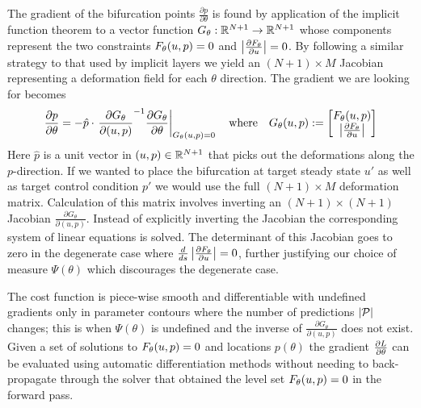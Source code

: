 \documentclass{article}
\begin{document}
The gradient of the bifurcation points $\frac{\partial p}{\partial\theta}$ is found by application of the implicit function theorem to a vector function $G_{\theta}:\mathbb{R}^{N+1}\rightarrow\mathbb{R}^{N+1}$ whose components represent the two constraints $F_{\theta}(u,p)=0$ and $\left| \frac{\partial F_{\theta}}{\partial u} \right|=0$. By following a similar strategy to that used by implicit layers \cite{Look2020DifferentiableLayers} we yield an $(N+1)\times M$ Jacobian representing a deformation field \cite{Jos2011OnSurface} for each $\theta$ direction. The gradient we are looking for becomes
\begin{align}
    \frac{\partial p}{\partial\theta} = -\hat{p}\cdot\left.\frac{\partial G_{\theta}}{\partial (u,p)}^{-1}
    \frac{\partial  G_{\theta}}{\partial\theta}\right|_{G_{\theta}(u,p)=0}
    \quad\mathrm{where}\quad
    G_{\theta}(u,p):=\begin{bmatrix}F_{\theta}(u,p)\\\left| \frac{\partial F_{\theta}}{\partial u} \right|\end{bmatrix}
    \label{eq:gradient-bifurcation}
\end{align}
Here $\hat{p}$ is a unit vector in $(u,p)\in\mathbb{R}^{N+1}$ that picks out the deformations along the $p$-direction. If we wanted to place the bifurcation at target steady state $u'$ as well as target control condition $p'$ we would use the full $(N+1)\times M$ deformation matrix. Calculation of this matrix involves inverting an $(N+1)\times(N+1)$ Jacobian $\frac{\partial G_{\theta}}{\partial(u,p)}$. Instead of explicitly inverting the Jacobian the corresponding system of linear equations is solved. The determinant of this Jacobian goes to zero in the degenerate case where $\frac{d}{ds}\left| \frac{\partial F_{\theta}}{\partial u} \right|=0$, further justifying our choice of measure $\Psi(\theta)$ which discourages the degenerate case.

The cost function is piece-wise smooth and differentiable with undefined gradients only in parameter contours where the number of predictions $|\mathcal{P}|$ changes; this is when $\Psi(\theta)$ is undefined and the inverse of $\frac{\partial G_{\theta}}{\partial (u,p)}$ does not exist. Given a set of solutions to $F_{\theta}(u,p)=0$ and locations $p(\theta)$ the gradient $\frac{\partial L}{\partial\theta}$ can be evaluated using automatic differentiation methods \cite{Revels2016Forward-ModeJulia,Innes2018FashionableFlux,Innes2018Flux:Julia} without needing to back-propagate through the solver that obtained the level set $F_{\theta}(u,p)=0$ in the forward pass.
\end{document}
